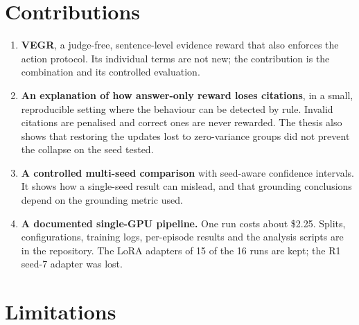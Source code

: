 \section{Contributions}\label{sec:5.2}

\begin{enumerate}
\def\labelenumi{\arabic{enumi}.}
\tightlist
\item
  \textbf{VEGR}, a judge-free, sentence-level evidence reward that also
  enforces the action protocol. Its individual terms are not new; the
  contribution is the combination and its controlled evaluation.
\item
  \textbf{An explanation of how answer-only reward loses citations}, in
  a small, reproducible setting where the behaviour can be detected by
  rule. Invalid citations are penalised and correct ones are never
  rewarded. The thesis also shows that restoring the updates lost to
  zero-variance groups did not prevent the collapse on the seed tested.
\item
  \textbf{A controlled multi-seed comparison} with seed-aware confidence
  intervals. It shows how a single-seed result can mislead, and that
  grounding conclusions depend on the grounding metric used.
\item
  \textbf{A documented single-GPU pipeline.} One run costs about \$2.25.
  Splits, configurations, training logs, per-episode results and the
  analysis scripts are in the repository. The LoRA adapters of 15 of the
  16 runs are kept; the R1 seed-7 adapter was lost.
\end{enumerate}

\section{Limitations}\label{sec:5.3}

